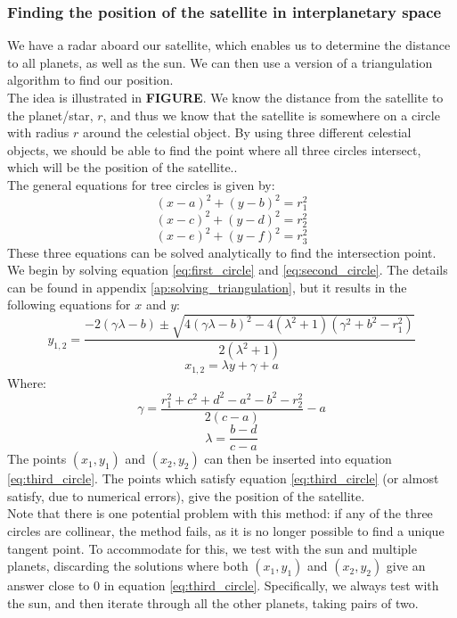 \documentclass[a4paper,10pt,english]{article}
\begin{document}
\subsubsection{Finding the position of the satellite in interplanetary space}\label{triangulate_position}
We have a radar aboard our satellite, which enables us to determine the distance to all planets, as well as the sun. We can then use a version of a triangulation algorithm to find our position.\\
\linebreak
The idea is illustrated in \textbf{FIGURE}. We know the distance from the satellite to the planet/star, $r$, and thus we know that the satellite is somewhere on a circle with radius $r$ around the celestial object. By using three different celestial objects, we should be able to find the point where all three circles intersect, which will be the position of the satellite..\\
\linebreak
The general equations for tree circles is given by:
\begin{equation}\label{eq:first_circle}
(x-a)^2+(y-b)^2=r_1^2
\end{equation}
\begin{equation}\label{eq:second_circle}
(x-c)^2+(y-d)^2= r_2^2
\end{equation}
\begin{equation}\label{eq:third_circle}
(x-e)^2+(y-f)^2=r_3^2
\end{equation}
These three equations can be solved analytically to find the intersection point. We begin by solving equation \ref{eq:first_circle} and \ref{eq:second_circle}. The details can be found in  appendix \ref{ap:solving_triangulation}, but it results in the following equations for $x$ and $y$:
\begin{equation}\label{eq:triangulation_y}
y_{1,2}=\frac{-2(\gamma\lambda-b)\pm \sqrt{4(\gamma \lambda - b)^2 -4(\lambda^2+1)(\gamma^2+b^2-r_1^2)}}{2(\lambda^2+1)}
\end{equation}
\begin{equation}
x_{1,2}=\lambda y +\gamma +a
\end{equation}
Where:
$$\gamma = \frac{r_1^2+c^2+d^2-a^2-b^2-r_2^2}{2(c-a)}-a$$
$$\lambda = \frac{b-d}{c-a}$$
The points $(x_1, y_1)$ and $(x_2, y_2)$ can then be inserted into equation \ref{eq:third_circle}. The points which satisfy equation \ref{eq:third_circle} (or almost satisfy, due to numerical errors), give the position of the satellite.\\
\linebreak
Note that there is one potential problem with this method: if any of the three circles are collinear, the method fails, as it is no longer possible to find a unique tangent point. To accommodate for this, we test with the sun and multiple planets, discarding the solutions where both $(x_1, y_1)$ and $(x_2, y_2)$ give an answer close to 0 in equation \ref{eq:third_circle}. Specifically, we always test with the sun, and then iterate through all the other planets, taking pairs of two.
 
\end{document}
